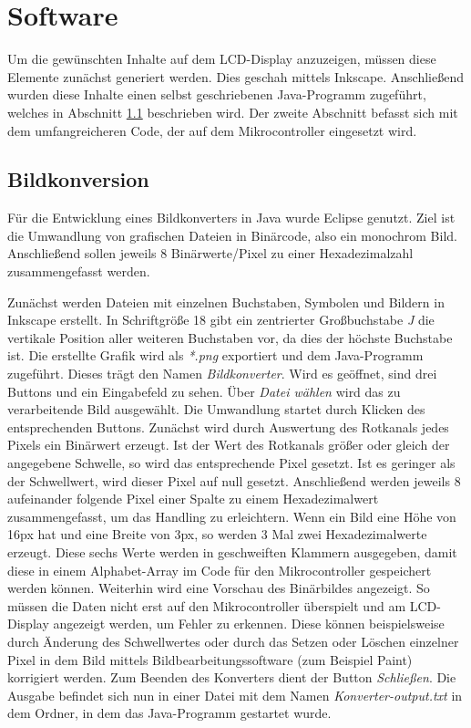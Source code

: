 \documentclass[journal, a4paper]{IEEEtran}
\begin{document}
\section{Software}
	Um die gewünschten Inhalte auf dem LCD-Display anzuzeigen, müssen diese Elemente zunächst generiert werden. Dies geschah mittels Inkscape. Anschließend wurden diese Inhalte einen selbst geschriebenen Java-Programm zugeführt, welches in Abschnitt \ref{sc:Software:subsc:Bildkonverter} beschrieben wird. Der zweite Abschnitt befasst sich mit dem umfangreicheren Code, der auf dem Mikrocontroller eingesetzt wird.
	\subsection{Bildkonversion}
		\label{sc:Software:subsc:Bildkonverter}
		Für die Entwicklung eines Bildkonverters in Java wurde Eclipse genutzt. Ziel ist die Umwandlung von grafischen Dateien in Binärcode, also ein monochrom Bild. Anschließend sollen jeweils 8 Binärwerte/Pixel zu einer Hexadezimalzahl zusammengefasst werden.\par 
		Zunächst werden Dateien mit einzelnen Buchstaben, Symbolen und Bildern in Inkscape erstellt. In Schriftgröße 18 gibt ein zentrierter Großbuchstabe \textit{J} die vertikale Position aller weiteren Buchstaben vor, da dies der höchste Buchstabe ist. Die erstellte Grafik wird als \textit{*.png} exportiert und dem Java-Programm zugeführt. Dieses trägt den Namen \textit{Bildkonverter}. Wird es geöffnet, sind drei Buttons und ein Eingabefeld zu sehen. Über \textit{Datei wählen} wird das zu verarbeitende Bild ausgewählt. Die Umwandlung startet durch Klicken des entsprechenden Buttons. Zunächst wird durch Auswertung des Rotkanals jedes Pixels ein Binärwert erzeugt. Ist der Wert des Rotkanals größer oder gleich der angegebene Schwelle, so wird das entsprechende Pixel gesetzt. Ist es geringer als der Schwellwert, wird dieser Pixel auf null gesetzt. Anschließend werden jeweils 8 aufeinander folgende Pixel einer Spalte zu einem Hexadezimalwert zusammengefasst, um das Handling zu erleichtern. Wenn ein Bild eine Höhe von 16px hat und eine Breite von 3px, so werden 3 Mal zwei Hexadezimalwerte erzeugt. Diese sechs Werte werden in geschweiften Klammern ausgegeben, damit diese in einem Alphabet-Array im Code für den Mikrocontroller gespeichert werden können. Weiterhin wird eine Vorschau des Binärbildes angezeigt. So müssen die Daten nicht erst auf den Mikrocontroller überspielt und am LCD-Display angezeigt werden, um Fehler zu erkennen. Diese können beispielsweise durch Änderung des Schwellwertes oder durch das Setzen oder Löschen einzelner Pixel in dem Bild mittels Bildbearbeitungssoftware (zum Beispiel Paint) korrigiert werden. Zum Beenden des Konverters dient der Button \textit{Schließen}. Die Ausgabe befindet sich nun in einer Datei mit dem Namen \textit{Konverter-output.txt} in dem Ordner, in dem das Java-Programm gestartet wurde.\par
\end{document}
